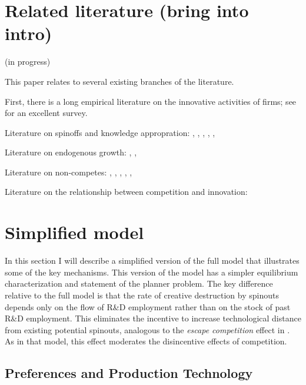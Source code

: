 \documentclass[12pt,english]{article}
\theoremstyle{remark}
\begin{document}
\section{Related literature (bring into intro)}\label{related_literature}

(in progress)

This paper relates to several existing branches of the literature. 

First, there is a long empirical literature on the innovative activities of firms; see \cite{cohen_fifty_2010} for an excellent survey.

Literature on spinoffs and knowledge appropration: \cite{anton_expropriation_1994}, \cite{anton_start-ups_1995}, \cite{franco_covenants_2008}, \cite{klepper_entry_2005}, \cite{klette_innovating_2004}, \cite{chatterjee_spinoffs_2012}

Literature on endogenous growth: \cite{grossman_quality_1991}, \cite{romer_increasing_1986}, \cite{aghion_model_1992}

Literature on non-competes: \cite{saxenian_regional_1994}, \cite{gilson_legal_1999}, \cite{jeffers_impact_2018}, \cite{marx_mobility_2009}, \cite{marx_regional_2015}, \cite{starr_noncompetes_2019}

Literature on the relationship between competition and innovation: \cite{aghion_competition_2005}

\section{Simplified model}\label{simplified_model}

In this section I will describe a simplified version of the full model that illustrates some of the key mechanisms. This version of the model has a simpler equilibrium characterization and statement of the planner problem. The key difference relative to the full model is that the rate of creative destruction by spinouts depends only on the flow of R\&D employment rather than on the stock of past R\&D employment. This eliminates the incentive to increase technological distance from existing potential spinouts, analogous to the \textit{escape competition} effect in \cite{aghion_competition_2005}. As in that model, this effect moderates the disincentive effects of competition.

\subsection{Preferences and Production Technology}
\end{document}
